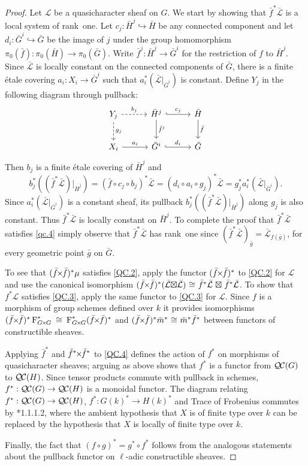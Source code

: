 \documentclass{amsart}
\theoremstyle{plain}
\theoremstyle{definition}
\theoremstyle{remark}
\newcommand{\Fq}{k}
\newcommand{\Frob}[1]{\operatorname{F}_{#1}}
\newcommand{\iso}{{\ \cong\ }}
\newcommand{\qcs}[1]{{\mathcal{#1}}}
\newcommand{\gqcs}[1]{{\mathcal{\bar #1}}}
\newcommand{\QC}{{\mathcal{Q\hskip-0.8pt C}}}
\renewcommand{\bf}{\bar{f}}
\newcommand{\bg}{\bar{g}}
\newcommand{\bm}{\bar{m}}
\newcommand{\bG}{\bar{G}}
\newcommand{\bH}{\bar{H}}
\newcommand{\tight}[3]{\hspace{-#1pt}{#2}\hspace{-#3pt}}
\newcommand{\bfxf}{\text{$\bar{f} \tight{1}{\times}{1} \bar{f}$}}
\newcommand{\GxxG}{\text{$G \tight{1}{\times}{1} G$}}
\newcommand{\LxL}{\text{$\gqcs{L} \tight{0}{\boxtimes}{0} \gqcs{L}$}}
\begin{document}
\begin{proof}
  Let $\qcs{L}$ be a quasicharacter sheaf on $G$. We start by showing that
  $\bf^*\gqcs{L}$ is a local system of rank~one. Let $c_j :\bH^j \hookrightarrow \bH$ be any
  connected component and let $d_i : \bG^i \hookrightarrow \bG$ be the image of $j$ under the group
  homomorphism $\pi_0(\bf) : \pi_0(\bH) \to \pi_0(\bG)$.  Write $\bf^j : \bH^j \to \bG^i$
  for the restriction of $f$ to $\bH^j$.  Since $\gqcs{L}$ is locally constant on the connected
  components of $\bG$, there is a finite \'etale covering
  $a_i : X_i \to \bG^i$ such that $a_i^* (\gqcs{L}\vert_{\bG^i})$
  is constant.  Define $Y_j$ in the following diagram through pullback:
  \[
  \begin{tikzcd}[row sep=20, column sep=30]
   Y_j \dar[dashed]{g_j} \rar[dashed]{b_j} & \bH^j \dar{\bf^j} \rar[hook]{c_j} & \bH \dar{\bf} \\
   X_i \rar{a_i} & \bG^i \rar[hook]{d_i} & \bG
  \end{tikzcd}
  \]
  Then $b_j$ is a finite \'etale covering
  of $\bH^j$ and
  \[
  b_j^* \left( (\bf^* \gqcs{L})\vert_{\bH^j}\right)
  = (\bf\circ c_j \circ b_j)^*\gqcs{L}
  = (d_i\circ a_i\circ g_j)^*\gqcs{L} = g_j^* a_i^* (\gqcs{L}\vert_{\bG^i}).
  \]
  Since $a_i^* (\gqcs{L}\vert_{\bG^i})$ is a constant sheaf, its pullback
  $b_j^* \left( (\bf^*\gqcs{L})\vert_{\bH^j}\right)$ along $g_j$ is also constant.
  Thus $\bf^*\gqcs{L}$ is locally constant on
  $\bH^j$. To complete the proof that $\bf^*\gqcs{L}$ satisfies
  \ref{qc.4}
  simply observe that $\bf^*\gqcs{L}$ has rank~one since
  $(\bf^*\gqcs{L})_{\bg} = \gqcs{L}_{f(\bg)}$, for every geometric point ${\bg}$ on $\bG$.


  To see that $(\bfxf)^* \mu$ satisfies \ref{QC.2},
  apply the functor $(\bfxf)^*$
  to \ref{QC.2} for $\qcs{L}$ and use the canonical isomorphism
  $(\bfxf)^*(\LxL) \iso \bf^*\gqcs{L} \tight{-3}{\boxtimes}{-3} \bf^*\gqcs{L}$.
  To show that $f^*\qcs{L}$ satisfies
  \ref{QC.3}, apply the same functor to \ref{QC.3} for $\qcs{L}$.
  Since $f$ is a morphism of group schemes defined over $\Fq$
  it provides isomorphisms $(\bfxf)^*\Frob{\GxxG}^* \iso \Frob{\GxxG}^* (\bfxf)^*$
  and $(\bfxf)^* \bm^*\iso \bm^* \bf^*$ between functors of constructible sheaves.

  Applying $\bf^*$ and $\bf^* \tight{1}{\times}{1}\bf^*$ to \ref{QC.4} defines the action
  of $f^*$ on morphisms of quasicharacter sheaves; arguing as above shows that $f^*$ is
  a functor from $\QC(G)$ to $\QC(H)$.  Since tensor products commute with pullback in schemes,
  $f^* : \QC(G) \to \QC(H)$ is a monoidal functor.
  The diagram relating $f^* : \QC(G) \to \QC(H)$, $f^* : G(k)^* \to H(k)^*$ and Trace of Frobenius
  commutes by \cite{laumon:87a}*{1.1.1.2}, where the ambient
  hypothesis that $X$ is of finite type over $\Fq$ can be replaced by
  the hypothesis that $X$ is locally of finite type over $\Fq$.

  Finally, the fact that $(f\circ g)^* = g^* \circ f^*$ follows from the analogous
  statements about the pullback functor on $\ell$-adic constructible sheaves.
\end{proof}
\end{document}
